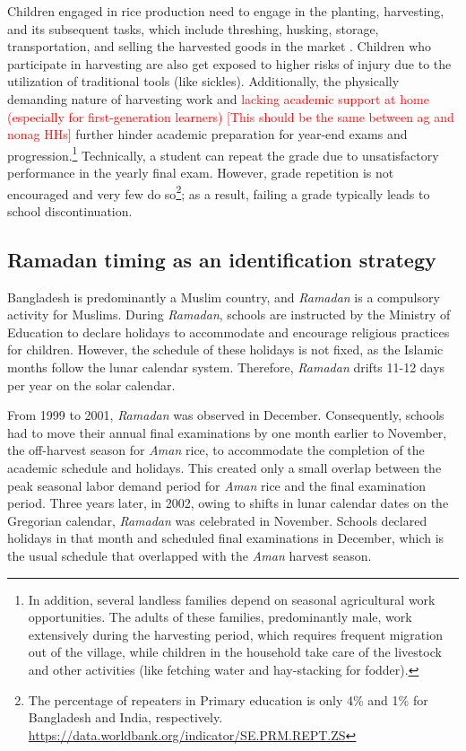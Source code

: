 \documentclass[12pt,letterpaper]{article}\usepackage[margin=1in]{geometry}
\newcommand{\SAdded}[1]{\textcolor{red}{#1}}
\newcommand{\0}{\ensuremath{\mbox{\boldmath $0$}}}
\begin{document}
Children engaged in rice production need to engage in the planting, harvesting, and its subsequent tasks, which include threshing, husking, storage, transportation, and selling the harvested goods in the market \citep{chowdhury2009participatory}. Children who participate in harvesting are also get exposed to higher risks of injury due to the utilization of traditional tools (like sickles). Additionally, the physically demanding nature of harvesting work and \SAdded{lacking academic support at home (especially for first-generation learners) [This should be the same between ag and nonag HHs]} further hinder academic preparation for year-end exams and progression.\footnote{In addition, several landless families depend on seasonal agricultural work opportunities. The adults of these families, predominantly male, work extensively during the harvesting period, which requires frequent migration out of the village, while children in the household take care of the livestock and other activities (like fetching water and hay-stacking for fodder). } Technically, a student can repeat the grade due to unsatisfactory performance in the yearly final exam. However, grade repetition is not encouraged and very few do so\footnote{The percentage of repeaters in Primary education is only 4\% and 1\% for Bangladesh and India, respectively. \url{https://data.worldbank.org/indicator/SE.PRM.REPT.ZS} }; as a result, failing a grade typically leads to school discontinuation.


\subsection{Ramadan timing as an identification strategy}

Bangladesh is predominantly a Muslim country, and \textit{Ramadan} is a compulsory activity for Muslims. During \textit{Ramadan}, schools are instructed by the Ministry of Education to declare holidays to accommodate and encourage religious practices for children. However, the schedule of these holidays is not fixed, as the Islamic months follow the lunar calendar system. Therefore, \textit{Ramadan} drifts 11-12 days per year on the solar calendar.

From 1999 to 2001, \textit{Ramadan} was observed in December. Consequently, schools had to move their annual final examinations by one month earlier to November, the off-harvest season for \textit{Aman} rice, to accommodate the completion of the academic schedule and holidays. This created only a small overlap between the peak seasonal labor demand period for \textit{Aman} rice and the final examination period. Three years later, in 2002, owing to shifts in lunar calendar dates on the Gregorian calendar, \textit{Ramadan} was celebrated in November. Schools declared holidays in that month and scheduled final examinations in December, which is the usual schedule that overlapped with the \textit{Aman} harvest season. 
\end{document}
